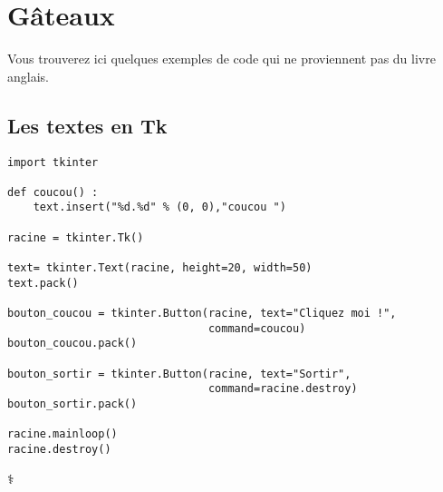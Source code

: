 
\chapter{Gâteaux}
Vous trouverez ici quelques exemples de code qui ne proviennent pas du livre anglais.
\section{Les textes en Tk}

\begin{Verbatim}[frame=single,rulecolor=\color{mbleu}, label=à taper]
import tkinter

def coucou() :
    text.insert("%d.%d" % (0, 0),"coucou ")

racine = tkinter.Tk()

text= tkinter.Text(racine, height=20, width=50)
text.pack()

bouton_coucou = tkinter.Button(racine, text="Cliquez moi !",
                               command=coucou)
bouton_coucou.pack()

bouton_sortir = tkinter.Button(racine, text="Sortir",
                               command=racine.destroy)
bouton_sortir.pack()

racine.mainloop()
racine.destroy()
\end{Verbatim}

\begin{center}
\textrm{⚕}
\end{center}


